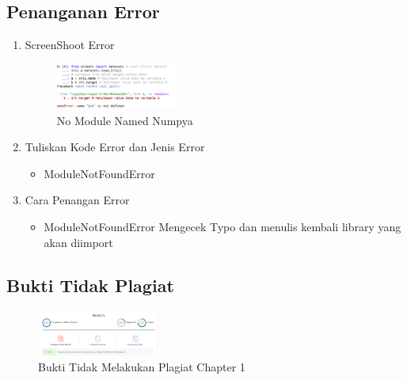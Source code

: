 \subsection{Penanganan Error}
\begin{enumerate}
	\item ScreenShoot Error
	\begin{figure}[H]
		\includegraphics[width=4cm]{figures/1174089/1/error.PNG}
		\centering
		\caption{No Module Named Numpya}
	\end{figure}

	\item Tuliskan Kode Error dan Jenis Error
	\begin{itemize}
		\item ModuleNotFoundError
	\end{itemize}
	\item Cara Penangan Error
	\begin{itemize}
		\item ModuleNotFoundError
		\hfill\break
		Mengecek Typo dan menulis kembali library yang akan diimport
	\end{itemize}
\end{enumerate}

\subsection{Bukti Tidak Plagiat}
\begin{figure}[H]
	\includegraphics[width=4cm]{figures/1174089/1/plagiarism.PNG}
	\centering
	\caption{Bukti Tidak Melakukan Plagiat Chapter 1}
\end{figure}


